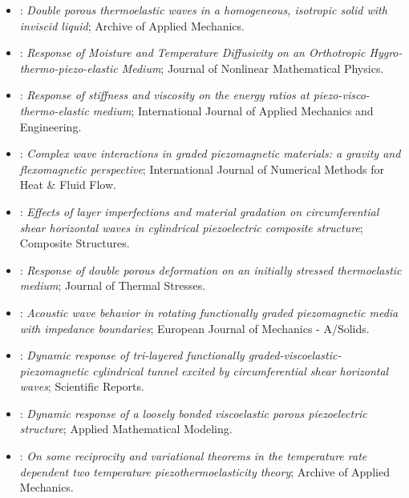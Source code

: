 \begin{itemize}
\item \citet{Pathania2023}: \emph{Double porous thermoelastic waves in a homogeneous, isotropic solid with inviscid liquid}; Archive of Applied Mechanics.
\item \citet{Gupta2024c}: \emph{Response of Moisture and Temperature Diffusivity on an Orthotropic Hygro-thermo-piezo-elastic Medium}; Journal of Nonlinear Mathematical Physics.
\item \citet{Kumar2024a}: \emph{Response of stiffness and viscosity on the energy ratios at piezo-visco-thermo-elastic medium}; International Journal of Applied Mechanics and Engineering.
\item \citet{Guha2025}: \emph{Complex wave interactions in graded piezomagnetic materials: a gravity and flexomagnetic perspective}; International Journal of Numerical Methods for Heat \& Fluid Flow.
\item \citet{Gupta2025}: \emph{Effects of layer imperfections and material gradation on circumferential shear horizontal waves in cylindrical piezoelectric composite structure}; Composite Structures.
\item \citet{Kumar2025a}: \emph{Response of double porous deformation on an initially stressed thermoelastic medium}; Journal of Thermal Stresses.
\item \citet{Guha2026}: \emph{Acoustic wave behavior in rotating functionally graded piezomagnetic media with impedance boundaries}; European Journal of Mechanics - A/Solids.
\item \citet{Gupta2026a}: \emph{Dynamic response of tri-layered functionally graded-viscoelastic-piezomagnetic cylindrical tunnel excited by circumferential shear horizontal waves}; Scientific Reports.
\item \citet{Meghana2026}: \emph{Dynamic response of a loosely bonded viscoelastic porous piezoelectric structure}; Applied Mathematical Modeling.
\item \citet{Srivastava2026}: \emph{On some reciprocity and variational theorems in the temperature rate dependent two temperature piezothermoelasticity theory}; Archive of Applied Mechanics.
\end{itemize}
